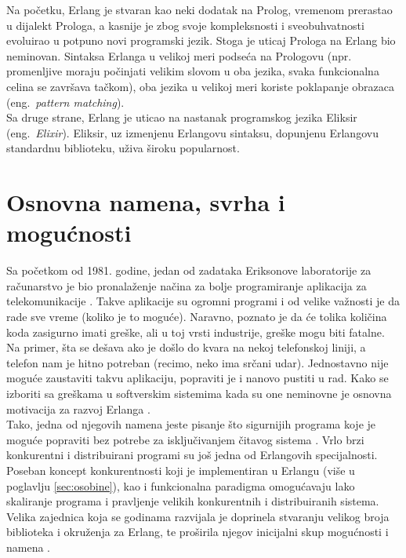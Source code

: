 \documentclass[a4paper]{article}
\begin{document}
{Na početku, Erlang je stvaran kao neki dodatak na Prolog, vremenom prerastao u 
dijalekt Prologa, a kasnije je zbog svoje kompleksnosti i sveobuhvatnosti evoluirao
u potpuno novi programski jezik. Stoga je uticaj Prologa na Erlang bio 
neminovan. Sintaksa Erlanga u velikoj meri podseća na Prologovu 
(npr. promenljive moraju počinjati velikim slovom u oba jezika, 
svaka funkcionalna celina se završava tačkom), oba jezika u velikoj meri koriste poklapanje obrazaca
(eng.~{\em pattern matching}). \\

Sa druge strane, Erlang je uticao na nastanak programskog jezika Eliksir (eng.~{\em Elixir}). Eliksir,
uz izmenjenu Erlangovu sintaksu, dopunjenu Erlangovu standardnu biblioteku, uživa široku popularnost.

\section{Osnovna namena, svrha i mogućnosti}
\label{sec:namena}

Sa početkom od 1981. godine, jedan od zadataka Eriksonove laboratorije za računarstvo je bio pronalaženje načina za bolje programiranje aplikacija
za telekomunikacije \cite{phdthesis}. Takve aplikacije su ogromni programi i od velike važnosti je da rade sve vreme (koliko je to moguće). 
Naravno, poznato je da će tolika količina koda zasigurno imati greške, ali u toj vrsti industrije, greške mogu biti fatalne. Na primer, 
šta se dešava ako je došlo do kvara na nekoj telefonskoj liniji, a telefon nam je hitno potreban (recimo, neko ima srčani udar).
Jednostavno nije moguće zaustaviti takvu aplikaciju, popraviti je i nanovo pustiti u rad.
Kako se izboriti sa greškama u softverskim sistemima kada su one neminovne je osnovna motivacija za razvoj Erlanga \cite{phdthesis}. \\

Tako, jedna od njegovih namena jeste pisanje što sigurnijih programa koje je moguće popraviti bez potrebe za isključivanjem čitavog sistema \cite{book_joe}.
Vrlo brzi konkurentni i distribuirani programi su još jedna od Erlangovih specijalnosti. 
Poseban koncept konkurentnosti koji je implementiran u Erlangu (više u poglavlju \ref{sec:osobine}), kao i funkcionalna paradigma 
omogućavaju lako skaliranje programa i pravljenje velikih konkurentnih i distribuiranih sistema.
Velika zajednica koja se godinama razvijala je doprinela stvaranju velikog broja biblioteka i okruženja za Erlang, te proširila njegov 
inicijalni skup mogućnosti i namena \cite{book_joe}. 

}
\end{document}
